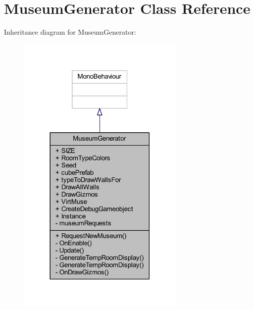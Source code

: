 \hypertarget{class_museum_generator}{}\section{Museum\+Generator Class Reference}
\label{class_museum_generator}


Inheritance diagram for Museum\+Generator\+:
\nopagebreak
\begin{figure}[H]
\begin{center}
\leavevmode
\includegraphics[width=230pt]{class_museum_generator__inherit__graph}
\end{center}
\end{figure}


